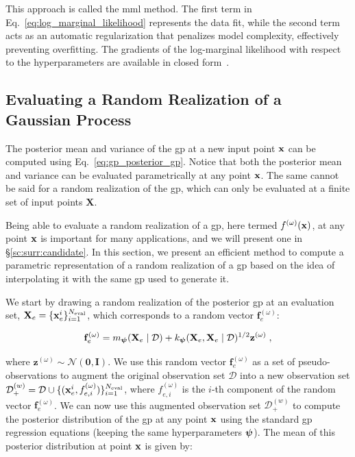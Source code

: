 This approach is called the \gls{mml} method. The first term in Eq.~\eqref{eq:log_marginal_likelihood} represents the data fit, while the second term acts as an automatic regularization that penalizes model complexity, effectively preventing overfitting. The gradients of the log-marginal likelihood with respect to the hyperparameters are available in closed form~\cite{gp_rasmussen}.

\subsection{Evaluating a Random Realization of a Gaussian Process}
\label{sec:ntools:constr}

The posterior mean and variance of the \gls{gp} at a new input point $\mathbf{x}$ can be computed using Eq.~\eqref{eq:gp_posterior_gp}. Notice that both the posterior mean and variance can be evaluated parametrically at any point $\mathbf{x}$. The same cannot be said for a random realization of the \gls{gp}, which can only be evaluated at a finite set of input points $\mathbf{X}$. 

\smallskip
Being able to evaluate a random realization of a \gls{gp}, here termed $f^{(\omega)}(\mathbf{x})$, at any point $\mathbf{x}$ is important for many applications, and we will present one in \S\ref{sc:surr:candidate}. In this section, we present an efficient method to compute a parametric representation of a random realization of a \gls{gp} based on the idea of interpolating it with the same \gls{gp} used to generate it.

\smallskip
We start by drawing a random realization of the posterior \gls{gp} at an evaluation set, $\mathbf{X}_e = \{\mathbf{x}_e^i\}_{i=1}^{N_{\mathrm{eval}}}$, which corresponds to a random vector $\mathbf{f}_e^{(\omega)}$:

\begin{equation}
    \mathbf{f}_e^{(\omega)} = m_{\boldsymbol{\psi}}(\mathbf{X}_e \mid \mathcal{D}) + k_{\boldsymbol{\psi}}(\mathbf{X}_e, \mathbf{X}_e \mid \mathcal{D})^{1/2} \mathbf{z}^{(\omega)}\;,
\label{eq:pred_mean_e}
\end{equation}

where $\mathbf{z}^{(\omega)} \sim \mathcal{N}(\mathbf{0}, \mathbf{I})$. We use this random vector $\mathbf{f}_e^{(\omega)}$ as a set of pseudo-observations to augment the original observation set $\mathcal{D}$ into a new observation set $\mathcal{D}_{+}^{(w)} = \mathcal{D} \cup \{(\mathbf{x}_e^i, f_{e,i}^{(\omega)})\}_{i=1}^{N_{\mathrm{eval}}}$, where $f_{e,i}^{(\omega)}$ is the $i$-th component of the random vector $\mathbf{f}_e^{(\omega)}$. We can now use this augmented observation set $\mathcal{D}_{+}^{(w)}$ to compute the posterior distribution of the \gls{gp} at any point $\mathbf{x}$ using the standard \gls{gp} regression equations (keeping the same hyperparameters $\boldsymbol{\psi}$). The mean of this posterior distribution at point $\mathbf{x}$ is given by:

